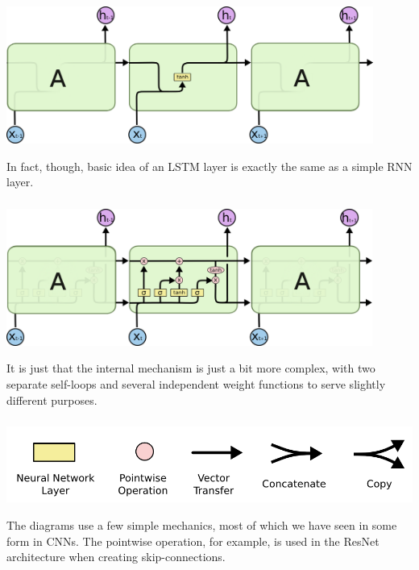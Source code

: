 \documentclass[xetex,mathserif,serif,aspectratio=169]{beamer}
\begin{document}
\begin{frame}[fragile] \frametitle{} \oldB \small

\begin{center}
\includegraphics[height=4.5cm]{img/cloah05.png}
\end{center}

In fact, though, basic idea of an LSTM layer is exactly
the same as a simple RNN layer.

\end{frame}

\begin{frame}[fragile] \frametitle{} \oldB \small

\begin{center}
\includegraphics[height=4.5cm]{img/cloah06.png}
\end{center}

It is just that the internal mechanism is just a bit more
complex, with two separate self-loops and several independent
weight functions to serve slightly different purposes.

\end{frame}

\begin{frame}[fragile] \frametitle{} \oldB \small

\begin{center}
\includegraphics[height=2.5cm]{img/cloah07.png}
\end{center}

The diagrams use a few simple mechanics, most of which
we have seen in some form in CNNs. The pointwise operation,
for example, is used in the ResNet architecture when creating
skip-connections.

\end{frame}
\end{document}
